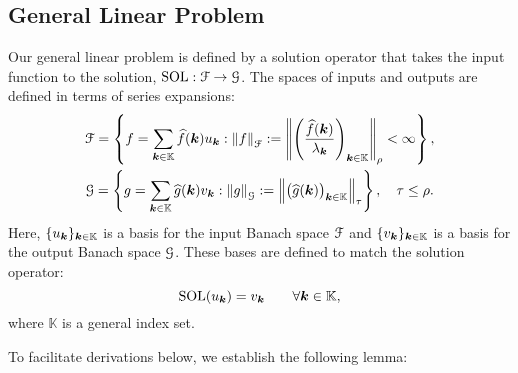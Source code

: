 \documentclass[USenglish]{article}
\DeclareMathOperator{\SOL}{SOL}
\newcommand{\hf}{\widehat{f}}
\newcommand{\hg}{\widehat{g}}
\newcommand{\norm}[2][{}]{\ensuremath{\left \lVert #2 \right \rVert}_{#1}}
\begin{document}
\subsection{General Linear Problem}
Our general linear problem is defined by a solution operator that takes the input function to the solution, $\SOL:\calF \to \calG$.  The spaces of inputs and outputs are defined in terms of series expansions:
\begin{gather}
    \calF = \left \{f = \sum_{\bsk \in \mathbb{K}} \hf(\bsk) u_{\bsk} : \norm[\calF]{f} : = \norm[\rho]{\left( \frac{\hf(\bsk)}{\lambda_{\bsk}} \right)_{\bsk \in \mathbb{K}}} < \infty \right\}, \\
    \calG = \left \{g = \sum_{\bsk \in \mathbb{K}} \hg(\bsk) v_{\bsk} : \norm[\calG]{g} : = \norm[\tau]{\bigl(  \hg(\bsk)  \bigr)_{\bsk \in \mathbb{K}}} \right\}, \quad \tau \le \rho.
\end{gather}
Here, $\{u_{{\boldsymbol{k}}}\}_{{\boldsymbol{k}} \in \mathbb{K}}$ is a basis for the input Banach space ${\mathcal{F}}$ and $\{v_{{\boldsymbol{k}}}\}_{{\boldsymbol{k}} \in \mathbb{K}}$ is a basis for the output Banach space ${\mathcal{G}}$. These bases are defined to match the solution operator:
\begin{equation}
    \SOL(u_{\bsk}) = v_{\bsk} \qquad \forall \bsk \in \mathbb{K},
\end{equation}
where $\mathbb{K}$ is a general index set.   

To facilitate derivations below, we establish the following lemma:
\end{document}
